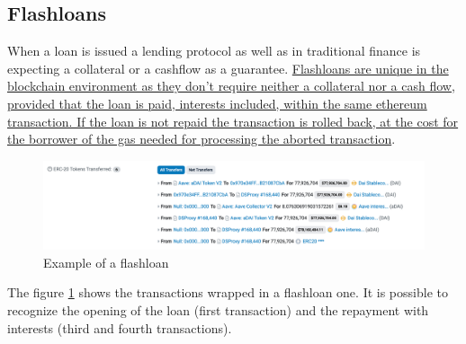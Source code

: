 \documentclass[11pt,a4paper,titlepage]{scrartcl}
\begin{document}
\subsection {Flashloans}

When a loan is issued a lending protocol as well as in traditional finance is expecting a collateral or a cashflow as a guarantee. \uline{Flashloans are unique in the blockchain environment as they don't require neither a collateral nor a cash flow, provided that the loan is paid, interests included, within the same ethereum transaction. If the loan is not repaid the transaction is rolled back, at the cost for the borrower of the gas needed for processing the aborted transaction}. 
\begin{figure}[ht]
    \includegraphics[width=1\textwidth]{image/flashloan.png}
    \caption{Example of a  flashloan}
    \label{fig:etherscanFLoan}
\end{figure}

The figure \ref{fig:etherscanFLoan} shows the transactions wrapped in a flashloan one. It is possible to recognize the opening of the loan (first transaction) and the repayment with interests (third and fourth transactions).
\end{document}
